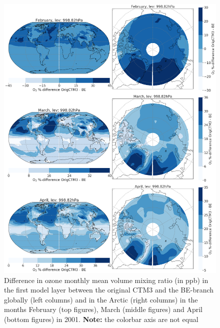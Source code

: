\begin{figure}[h]
    \centering
    \includegraphics[width = \linewidth]{Chapter6_Results/images/Orig_BE_comp/BE_origPD_vmr_lev0_FebApr_2001.png}
    \caption{Difference in ozone monthly mean volume mixing ratio (in ppb) in the first model layer between the original CTM3 and the BE-branch globally (left columns) and in the Arctic (right columns) in the months February (top figures), March (middle figures) and April (bottom figures) in 2001. \textbf{Note:} the colorbar axis are not equal}
    \label{fig:BE_origPD_vmr_FebApr}
\end{figure}


